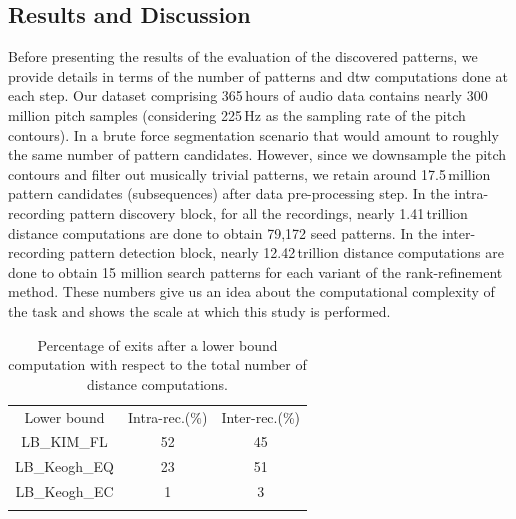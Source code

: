 \subsection{Results and Discussion}
\label{sec:patterns_discovery_results}

Before presenting the results of the evaluation of the discovered patterns, we provide details in terms of the number of patterns and \gls{dtw} computations done at each step. Our dataset comprising 365\,hours of audio data contains nearly 300\,million pitch samples (considering 225\,Hz as the sampling rate of the pitch contours). In a brute force segmentation scenario that would amount to roughly the same number of pattern candidates. However, since we downsample the pitch contours and filter out musically trivial patterns, we retain around 17.5\,million pattern candidates (subsequences) after data pre-processing step. In the intra-recording pattern discovery block, for all the recordings, nearly 1.41\,trillion distance computations are done to obtain 79,172 seed patterns. In the inter-recording pattern detection block, nearly 12.42\,trillion distance computations are done to obtain 15 million search patterns for each variant of the rank-refinement method. These numbers give us an idea about the computational complexity of the task and shows the scale at which this study is performed.

\begin{table} 
	\begin{centering}
		\begin{tabular}{ c | c c }
			\tabletop
			Lower bound   	& Intra-rec.(\%)		&	Inter-rec.(\%) \\	
			\tablemid
			LB\_KIM\_FL   	& 52	&	45 \\	
			LB\_Keogh\_EQ   	& 23	&	51 \\
			LB\_Keogh\_EC   		& 1	&	3 \\
			\tablebot
		\end{tabular}
		\caption{Percentage of exits after a lower bound computation with respect to the total number of distance computations.}
		\label{tab:computationalStats}	
		\par \end{centering}	
\end{table}

